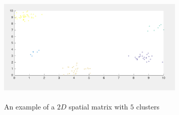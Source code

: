 \documentclass{acm_proc_article-sp}
\begin{document}
   


\begin{figure}[!h]
\centering
   \includegraphics[width=9cm ,height=5.5cm]{figuresPng/clust.png}
   \caption{An example of a $2D$ spatial matrix with $5$ clusters }\label{fig: clust}
\end{figure}
\end{document}
